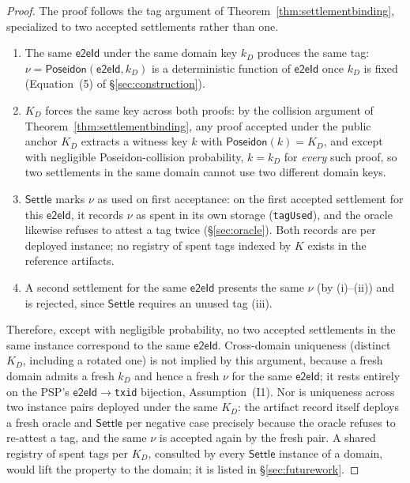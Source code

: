 \documentclass[11pt]{article}
\newcommand{\Poseidon}{\ensuremath{\mathsf{Poseidon}}}
\newcommand{\eeid}{\ensuremath{\mathsf{e2eId}}}
\newcommand{\code}[1]{\texttt{#1}}
\begin{document}
\begin{proof}
The proof follows the tag argument of Theorem~\ref{thm:settlementbinding},
specialized to two accepted settlements rather than one.
\begin{enumerate}
\item[(i)] The same \eeid{} under the same domain key $k_D$ produces the same
tag: $\nu=\Poseidon(\eeid,k_D)$ is a deterministic function of \eeid{} once
$k_D$ is fixed (Equation~(5) of \S\ref{sec:construction}).
\item[(ii)] $K_D$ forces the same key across both proofs: by the collision
argument of Theorem~\ref{thm:settlementbinding}, any proof accepted under the
public anchor $K_D$ extracts a witness key $k$ with $\Poseidon(k)=K_D$, and
except with negligible Poseidon-collision probability, $k=k_D$ for \emph{every}
such proof, so two settlements in the same domain cannot use two different
domain keys.
\item[(iii)] $\mathsf{Settle}$ marks $\nu$ as used on first acceptance: on the
first accepted settlement for this \eeid{}, it records $\nu$ as spent in its
own storage (\code{tagUsed}), and the oracle likewise refuses to attest a tag
twice (\S\ref{sec:oracle}). Both records are per deployed instance; no
registry of spent tags indexed by $K$ exists in the reference artifacts.
\item[(iv)] A second settlement for the same \eeid{} presents the same $\nu$
(by (i)--(ii)) and is rejected, since $\mathsf{Settle}$ requires an unused
tag (iii).
\end{enumerate}
Therefore, except with negligible probability, no two accepted settlements in
the same instance correspond to the same \eeid{}. Cross-domain uniqueness
(distinct $K_D$, including a rotated one) is not implied by this argument,
because a fresh domain admits a fresh $k_D$ and hence a fresh $\nu$ for the same
\eeid{}; it rests entirely on the PSP's \eeid{}$\to$\code{txid} bijection,
Assumption~(I1). Nor is uniqueness across two instance pairs deployed under the
same $K_D$: the artifact record itself deploys a fresh oracle and
$\mathsf{Settle}$ per negative case precisely because the oracle refuses to
re-attest a tag, and the same $\nu$ is accepted again by the fresh pair. A
shared registry of spent tags per $K_D$, consulted by every $\mathsf{Settle}$
instance of a domain, would lift the property to the domain; it is listed in
\S\ref{sec:futurework}.
\end{proof}
\end{document}
